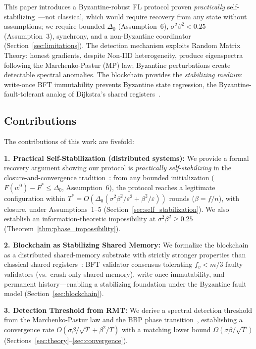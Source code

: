 This paper introduces a Byzantine-robust FL protocol proven \emph{practically} self-stabilizing~\cite{dolev_kat_practical}---not classical, which would require recovery from any state without assumptions; we require bounded $\Delta_0$ (Assumption~6), $\sigma^2\beta^2<0.25$ (Assumption~3), synchrony, and a non-Byzantine coordinator (Section~\ref{sec:limitations}). The detection mechanism exploits Random Matrix Theory: honest gradients, despite Non-IID heterogeneity, produce eigenspectra following the Marchenko-Pastur (MP) law; Byzantine perturbations create detectable spectral anomalies. The blockchain provides the \emph{stabilizing medium}: write-once BFT immutability prevents Byzantine state regression, the Byzantine-fault-tolerant analog of Dijkstra's shared registers~\cite{dijkstra_self_stab}.

\subsection{Contributions}

The contributions of this work are fivefold:

\textbf{1. Practical Self-Stabilization (distributed systems):} We provide a formal
recovery argument showing our protocol is \emph{practically self-stabilizing} in the
closure-and-convergence tradition~\cite{arora_gouda,dolev_kat_practical}: from any
bounded initialization ($F(w^0)-F^*\leq\Delta_0$, Assumption~6), the protocol
reaches a legitimate configuration within
$T^* = O(\Delta_0(\sigma^2\beta^2/\varepsilon^2 + \beta^2/\varepsilon))$
rounds ($\beta = f/n$), with closure, under Assumptions~1--5
(Section~\ref{sec:self_stabilization}).
We also establish an information-theoretic impossibility at $\sigma^2\beta^2 \geq 0.25$
(Theorem~\ref{thm:phase_impossibility}).

\textbf{2. Blockchain as Stabilizing Shared Memory:} We formalize the blockchain as a
distributed shared-memory substrate with strictly stronger properties than classical
shared registers~\cite{dijkstra_self_stab}: BFT validator consensus tolerating
$f_v < m/3$ faulty validators (vs.\ crash-only shared memory), write-once immutability,
and permanent history---enabling a stabilizing foundation under the Byzantine fault
model (Section~\ref{sec:blockchain}).

\textbf{3. Detection Threshold from RMT:} We derive a spectral detection threshold from
the Marchenko-Pastur law and the BBP phase transition~\cite{bbp_transition}, establishing
a convergence rate $O(\sigma\beta/\sqrt{T} + \beta^2/T)$ with a matching lower bound
$\Omega(\sigma\beta/\sqrt{T})$ (Sections~\ref{sec:theory}--\ref{sec:convergence}).

